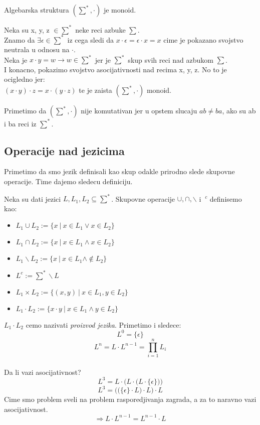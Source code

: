 \documentclass{memoir}
\begin{document}
\begin{teorema}
 Algebarska struktura $(\sum^*, \cdot)$ je monoid.
\end{teorema}
\begin{dokaz}
 Neka su x, y, z $\in \sum^*$ neke reci azbuke $\sum$.\\
 Znamo da $\exists \epsilon \in \sum^* $ iz cega sledi da $ x \cdot \epsilon = \epsilon \cdot x = x $ cime je pokazano svojstvo neutrala u odnosu na $\cdot$. \\
 Neka je $x \cdot y = w \rightarrow w \in \sum^*$ jer je $\sum^*$ skup svih reci nad azbukom $\sum$. \\
 I konacno, pokazimo svojstvo asocijativnosti nad recima x, y, z. No to je ocigledno jer: \\
 $(x \cdot y)\cdot z = x \cdot (y \cdot z)$ te je zaista $(\sum^*, \cdot)$ monoid.
\end{dokaz}

Primetimo da $(\sum^*, \cdot)$ nije komutativan jer u opstem slucaju $ab \not= ba$, ako su ab i ba reci iz $\sum^*$.

\subsection{Operacije nad jezicima}
Primetimo da smo jezik definisali kao skup odakle prirodno slede skupovne operacije. Time dajemo sledecu definiciju.

\begin{definicija}
 Neka su dati jezici $L, L_1, L_2 \subseteq \sum^*$. Skupovne operacije $\cup, \cap,  \backslash  $ i $\ ^c$ definisemo kao:
 \begin{itemize}
  \item $L_1 \cup L_2 := \{x \ | \ x \in L_1 \vee x \in L_2 \}$
  \item $L_1 \cap L_2 := \{x \ | \ x \in L_1 \wedge x \in L_2 \}$
  \item $L_1 \backslash L_2 := \{x \ | \ x \in L_1 \wedge \notin L_2 \}$
  \item $L^c := \sum^* \backslash L$
  \item $L_1 \times L_2 := \{(x, y) \ | \ x \in L_1, y \in L_2 \}$
  \item $L_1 \cdot L_2 := \{x \cdot y \ | \ x \in L_1 \wedge y \in L_2 \}$
 \end{itemize}
\end{definicija}

$L_1 \cdot L_2$ cemo nazivati \emph{proizvod jezika}. Primetimo i sledece: 
$$ L^0 = \{ \epsilon \} $$
$$ L^n = L \cdot L^{n-1} = \prod_{i = 1}^{n} L_i $$ \\ 
Da li vazi asocijativnost? \\
$$ L^3  = L \cdot \Big(L \cdot \big(L \cdot \{\epsilon\} \big) \Big) $$
$$ L^3 = \Big( \big(\{ \epsilon \} \cdot L \big) \cdot L \Big) \cdot L $$
Cime smo problem sveli na problem rasporedjivanja zagrada, a za to naravno vazi asocijativnost.
$$ \Longrightarrow L \cdot L^{n-1} = L^{n-1} \cdot L $$
\end{document}
